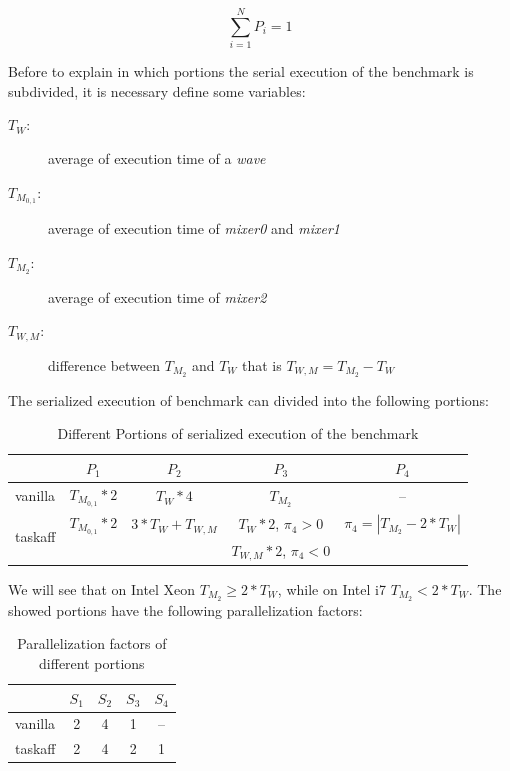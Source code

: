 \begin{equation}
       \sum_{i=1}^N P_{i} = 1
\label{eq:contr_amdhal}
\end{equation}

Before to explain in which portions the serial execution of the benchmark is subdivided, it is necessary define some variables:

\begin{description}
\item[$T_{W}$:] average of execution time of a \textit{wave}
\item[$T_{M_{0,1}}$:] average of execution time of \textit{mixer0} and \textit{mixer1}
\item[$T_{M_{2}}$:] average of execution time of \textit{mixer2}
\item[$T_{W,M}$:] difference between $T_{M_{2}}$ and $T_{W}$ that is $T_{W,M} = T_{M_{2}} - T_{W}$
\end{description}

The serialized execution of benchmark can divided into the following portions:

\begin{table}[htbp]
\begin{center}
\begin{tabular}{|l|c|c|c|c|} \hline
& $P_{1}$ & $P_{2}$ & $P_{3}$ & $P_{4}$ \\ \hline
vanilla & $T_{M_{0,1}}*2$ & $T_{W}*4$ & $T_{M_{2}}$ & -- \\ \hline
\multirow{2}{*}{taskaff} & {$T_{M_{0,1}}*2$} & $3*T_{W} + T_{W,M}$ & $T_{W}*2$, $\pi_{4} > 0$ & $\pi_{4} = |T_{M_{2}} - 2*T_{W}|$ \\
& & & $T_{W,M}*2$, $\pi_{4} < 0$ & \\  \hline
\end{tabular}
\caption{Different Portions of serialized execution of the benchmark}
\label{tab:portions_van_tsk}
\end{center}
\end{table}

We will see that on Intel Xeon $T_{M_{2}} \ge 2*T_{W}$, while on Intel i7 $T_{M_{2}} < 2*T_{W}$. The showed portions have the following
parallelization factors:

\begin{table}[htbp]
\begin{center}
\begin{tabular}{|l|c|c|c|c|} \hline
& $S_{1}$ & $S_{2}$ & $S_{3}$ & $S_{4}$ \\ \hline
vanilla & 2 & 4 & 1 & --\\ \hline
taskaff & 2 & 4 & 2 & 1 \\ \hline
\end{tabular}
\caption{Parallelization factors of different portions}
\label{tab:speedups_van_tsk}
\end{center}
\end{table}

